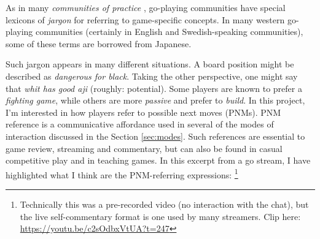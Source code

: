 \documentclass{scrartcl}
\begin{document}
As in many \emph{communities of practice} \citep{gumperzSpeechCommunity1972},
go-playing communities have special lexicons of \emph{jargon} 
for referring to game-specific concepts. 
In many western go-playing communities 
(certainly in English and Swedish-speaking communities), 
some of these terms are borrowed from Japanese.

Such jargon appears in many different situations.
A board position might be described as \textit{dangerous for black}.
Taking the other perspective, one might say that 
\textit{whit has good aji} (roughly: potential).
Some players are known to prefer a \textit{fighting game},
while others are more \textit{passive} and prefer to \textit{build}.
In this project, I'm interested in how players refer to 
possible next moves (PNMs).
PNM reference is a communicative affordance used
in several of the modes of interaction discussed in the Section \ref{sec:modes}.
Such references are essential to game review, streaming and commentary,
but can also be found in casual competitive play and in teaching games.
In this excerpt from a go stream, I have highlighted what I think are the
PNM-referring expressions:%
\footnote{%
  Technically this was a pre-recorded video (no interaction with the chat), 
  but the live self-commentary format is one used by many streamers.
  Clip here: \url{https://youtu.be/c2sOdbxVtUA?t=247}}
\end{document}
